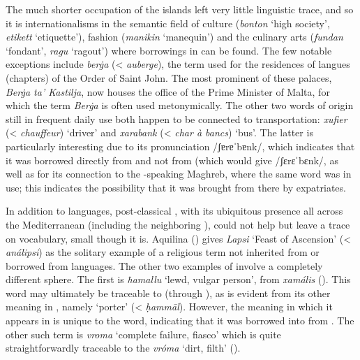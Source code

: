 \documentclass[output=paper]{langsci/langscibook}
\begin{document}
The much shorter  occupation of the  islands left very little linguistic trace, and so it is internationalisms in the semantic field of culture (\textit{bonton} `high society', \textit{etikett} `etiquette'), fashion (\textit{manikin} `manequin') and the culinary arts (\textit{fundan} `fondant', \textit{ragu} `ragout') where  borrowings in  can be found. The few notable exceptions include \textit{berġa} (< \textit{auberge}), the term used for the residences of langues (chapters) of the Order of Saint John. The most prominent of these palaces, \textit{Berġa ta' Kastilja}, now houses the office of the Prime Minister of Malta, for which the term \textit{Berġa} is often used metonymically. The other two  words of  origin still in frequent daily use both happen to be connected to transportation: \textit{xufier} (< \textit{chauffeur}) `driver' and \textit{xarabank} (< \textit{char à bancs}) `bus'. The latter is particularly interesting due to its pronunciation /ʃɐrɐˈbɐnk/, which indicates that it was borrowed directly from  and not from  (which would give /ʃɛrɛˈbɛnk/, as well as for its connection to the -speaking Maghreb, where the same word was in use; this indicates the possibility that it was brought from there by  expatriates.

In addition to  languages, post-classical , with its ubiquitous presence all across the Mediterranean (including the neighboring ), could not help but leave a trace on  vocabulary, small though it is. Aquilina (\citeyear[23]{aquilina1976}) gives \textit{Lapsi} `Feast of Ascension' (< \textit{análipsi}) as the solitary example of a  religious term not inherited from   or borrowed from  languages. The other two examples of   involve a completely different sphere. The first is \textit{ħamallu} `lewd, vulgar person', from  \textit{xamális} (\citealt[7781]{megaleksikon1958}). This word may ultimately be traceable to  (through ), as is evident from its other meaning in , namely `porter' (< \textit{ḥammāl}). However, the meaning in which it appears in  is unique to the  word, indicating that it was borrowed into  from . The other such term is \textit{vroma} `complete failure, fiasco' which is quite straightforwardly traceable to the  \textit{vróma} `dirt, filth' (\citealt[1506, 1516]{megaleksikon1958}).
\end{document}
